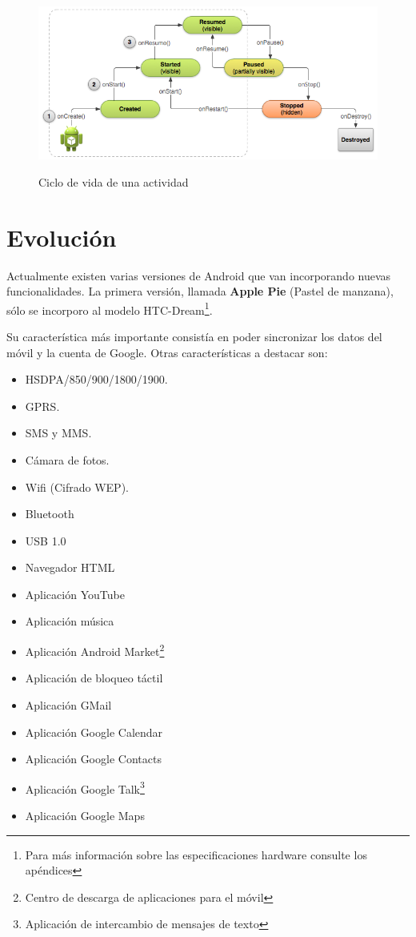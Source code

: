 \begin{figure}[!h]
\centering
\includegraphics[height=5.8cm]{imagenes/capitulo2/activity_lifecycle2.png}
\caption{Ciclo de vida de una actividad}
\end{figure}

\section{Evolución}

Actualmente existen varias versiones de Android que van incorporando nuevas funcionalidades. La primera versión, llamada \textbf{Apple Pie} (Pastel de manzana), sólo se incorporo al modelo HTC-Dream\footnote{Para más información sobre las especificaciones hardware consulte los apéndices}.
\newline

Su característica más importante consistía en poder sincronizar los datos del móvil y la cuenta de Google. Otras  características a destacar son:
\begin{multicols}{2}
\begin{itemize}
\item HSDPA/850/900/1800/1900.
\item GPRS.
\item SMS y MMS.
\item Cámara de fotos.
\item Wifi (Cifrado WEP).
\item Bluetooth
\item USB 1.0
\item Navegador HTML 
\item Aplicación YouTube
\end{itemize}
\begin{itemize}
\item Aplicación música
\item Aplicación Android Market\footnote{Centro de descarga de aplicaciones para el móvil}
\item Aplicación de bloqueo táctil
\item Aplicación GMail
\item Aplicación Google Calendar
\item Aplicación Google Contacts
\item Aplicación Google Talk\footnote{Aplicación de intercambio de mensajes de texto}
\item Aplicación Google Maps

\end{itemize}
\end{multicols}

